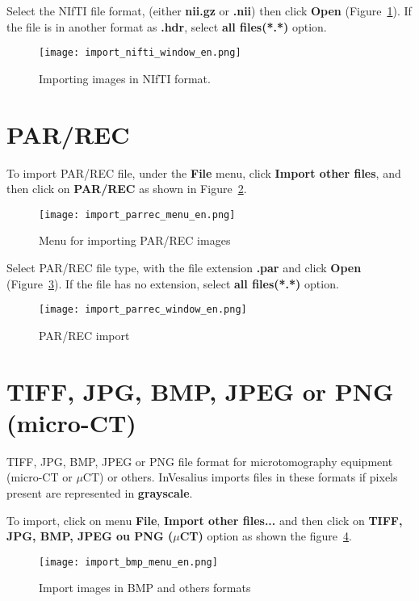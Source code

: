 Select the NIfTI file format, (either \textbf{nii.gz} or \textbf{.nii}) then click \textbf{Open} (Figure~\ref{fig:import_nifti_window_pt}). If the file is in another format as \textbf{.hdr}, select \textbf{all files(*.*)} option.

\begin{figure}[!htb]
\centering
\texttt{[image: import\_nifti\_window\_en.png]}
\caption{Importing images in NIfTI format.}
\label{fig:import_nifti_window_pt}
\end{figure}

\section{PAR/REC}

To import PAR/REC file, under the \textbf{File} menu, click \textbf{Import other files}, and then click on \textbf{PAR/REC} as shown in Figure~\ref{fig:import_parrec_menu_pt}.

\begin{figure}[!htb]
\centering
\texttt{[image: import\_parrec\_menu\_en.png]}
\caption{Menu for importing PAR/REC images}
\label{fig:import_parrec_menu_pt}
\end{figure}

Select PAR/REC file type, with the file extension \textbf{.par} and click \textbf{Open} (Figure~\ref{fig:import_parrec_window_pt}). If the file has no extension, select \textbf{all files(*.*)} option.

\begin{figure}[!htb]
\centering
\texttt{[image: import\_parrec\_window\_en.png]}
\caption{PAR/REC import}
\label{fig:import_parrec_window_pt}
\end{figure}

\section{TIFF, JPG, BMP, JPEG or PNG (micro-CT)}

TIFF, JPG, BMP, JPEG or PNG file format for microtomography equipment (micro-CT or $\mu$CT) or others. InVesalius imports files in these formats if pixels present are represented in \textbf{grayscale}.

To import, click on menu \textbf{File}, \textbf{Import other files...} and then click on \textbf{TIFF, JPG, BMP, JPEG ou PNG ($\mu$CT)} option as shown the figure~\ref{fig:import_bmp_menu_pt}.

\begin{figure}[!htb]
\centering
\texttt{[image: import\_bmp\_menu\_en.png]}
\caption{Import images in BMP and others formats}
\label{fig:import_bmp_menu_pt}
\end{figure}

